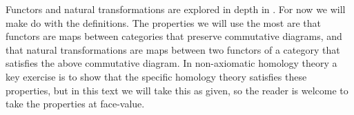 Functors and natural transformations are explored in depth in \cite{Leinster}. For now we will make do with the definitions. The properties we will use the most are that functors are maps between categories that preserve commutative diagrams, and that natural transformations are maps between two functors of a category that satisfies the above commutative diagram. In non-axiomatic homology theory a key exercise is to show that the specific homology theory satisfies these properties, but in this text we will take this as given, so the reader is welcome to take the properties at face-value.